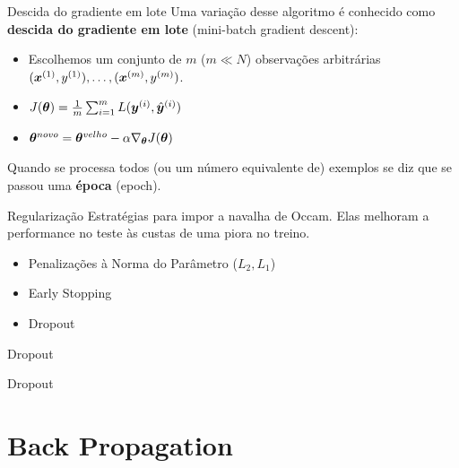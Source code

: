 \documentclass[10pt]{beamer}
\begin{document}
\begin{frame}[fragile]{Descida do gradiente em lote}
Uma variação desse algoritmo é conhecido como \textbf{descida do gradiente em lote} (\alert{mini-batch gradient descent}):

\begin{itemize}
\item Escolhemos um conjunto de $m$ ($m \ll N$) observações arbitrárias $(\bm{x}^{(1)},y^{(1)}), \dots, (\bm{x}^{(m)},y^{(m)})$.
\vspace{0.3cm}
\item $J(\bm{\theta}) =  \frac{1}{m}\sum_{i=1}^{m} L(\bm{y}^{(i)}, {\hat{\bm{y}}}^{(i)})$
\vspace{0.3cm}
\item $\bm{\theta}^{novo} = \bm{\theta}^{velho} - \alpha \nabla_{\bm{\theta}} {J(\bm{\theta})}$
\end{itemize}
Quando se processa todos (ou um número equivalente de) exemplos se diz que se passou uma \textbf{época} (\alert{epoch}).
\end{frame}

\begin{frame}[fragile]{Regularização}
Estratégias para impor a navalha de Occam. Elas melhoram a performance no teste às custas de uma piora no treino.
\vspace{0.3cm}
\begin{itemize}
	\item Penalizações à Norma do Parâmetro ($L_2, L_1$)\\
    \vspace{0.3cm}
    \item Early Stopping
    \vspace{0.3cm}
    \item Dropout
    
\end{itemize}
\end{frame}

\begin{frame}[fragile]{Dropout}

\end{frame}

\begin{frame}[fragile]{Dropout}

\end{frame}

\section{Back Propagation}
\end{document}
